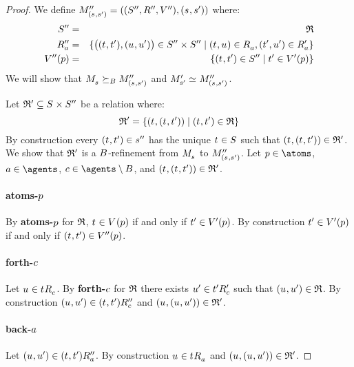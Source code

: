 \begin{proof}
We define $\kPModelAndTuplePP{(\kStateS, \kStateSP)}$ where:
\begin{eqnarray*}
    \kStatesPP &=& \refinement\\
    \kAccessibilityPPA &=& \{\big((\kStateT, \kStateTP), (\kStateU, \kStateUP)\big) \in \kStatesPP \times \kStatesPP \mid (\kStateT, \kStateU) \in \kAccessibilityA, (\kStateTP, \kStateUP) \in \kAccessibilityPA\}\\
    \kValuationPP(\atomP) &=& \{(\kStateT, \kStateTP) \in \kStatesPP \mid \kStateTP \in \kValuationP(\atomP)\}
\end{eqnarray*}
We will show that $\kPModel{\kStateS} \simulatesBs \kPModelPP{(\kStateS, \kStateSP)}$ and $\kPModelP{\kStateSP} \bisimilar \kPModelPP{(\kStateS, \kStateSP)}$.

Let $\refinement' \subseteq \kStates \times \kStatesPP$ be a relation where:
$$
\refinement' = \{(\kStateT, (\kStateT, \kStateTP)) \mid (\kStateT, \kStateTP) \in \refinement\}
$$
By construction every $(\kStateT, \kStateTP) \in \kStateSPP$ has the unique $\kStateT \in \kStates$ such that $(\kStateT, (\kStateT, \kStateTP)) \in \refinement'$.
We show that $\mathfrak{R}'$ is a $B$-refinement from $\kPModel{\kStateS}$ to $\kPModelPP{(\kStateS, \kStateSP)}$.
Let $\atomP \in \atoms$, $\agentA \in \agents$, $\agentC \in \agents \setminus \agentsB$, and $(\kStateT, (\kStateT, \kStateTP)) \in \refinement'$.

\paragraph{atoms-$p$}
By {\bf atoms-$p$} for $\mathfrak{R}$, $\kStateT \in \kValuation(\atomP)$ if and only if ${t}^{\prime} \in {V^{\prime}}(p)$.
By construction ${t}^{\prime} \in {V^{\prime}}(p)$ if and only if $(\kStateT, \kStateTP) \in \kValuationPP(\atomP)$.

\paragraph{forth-$c$}
Let $\kStateU \in \kSuccessorsC{\kStateT}$.
By {\bf forth-$c$} for $\mathfrak{R}$ there exists ${u}^{\prime} \in {{t}^{\prime}} {R^{\prime}_{c}}$ such that $(\kStateU, \kStateUP) \in \refinement$.
By construction $(\kStateU, \kStateUP) \in \kSuccessorsPPC{(\kStateT, \kStateTP)}$ and $(\kStateU, (\kStateU, \kStateUP)) \in \refinement'$.

\paragraph{back-$a$}
Let $(\kStateU, \kStateUP) \in \kSuccessorsPPA{(\kStateT, \kStateTP)}$.
By construction $\kStateU \in \kSuccessorsA{\kStateT}$ and $(\kStateU, (\kStateU, \kStateUP)) \in \refinement'$.


\end{proof}
